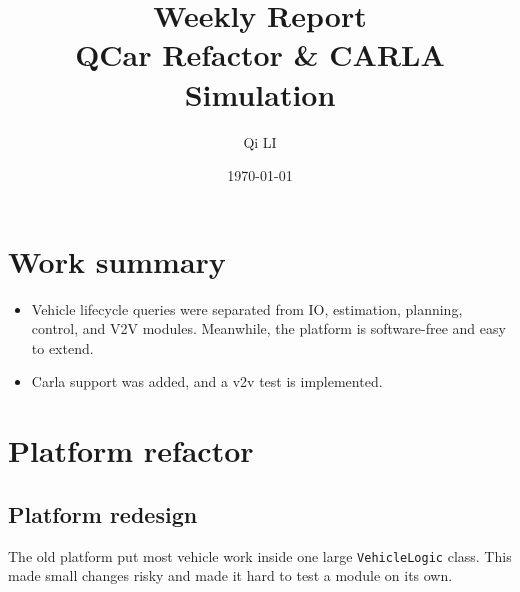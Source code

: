 \documentclass[11pt,a4paper]{article}
\title{\textbf{Weekly Report}\\[4pt]\large QCar Refactor \& CARLA Simulation}
\author{Qi LI}
\date{\today}
\begin{document}
\twocolumn[
\maketitle
\tableofcontents
\vspace{1em}
]
\small
\section{Work summary}
\begin{itemize}
    \item Vehicle lifecycle queries were separated from IO, estimation, planning, control, and V2V modules. Meanwhile, the platform is software-free and easy to extend.
    \item Carla support was added, and a v2v test is implemented.
\end{itemize}
\section{Platform refactor}

\subsection{Platform redesign}
The old platform put most vehicle work inside one large \texttt{VehicleLogic} class. This made small changes risky and made it hard to test a module on its own.

\end{document}
